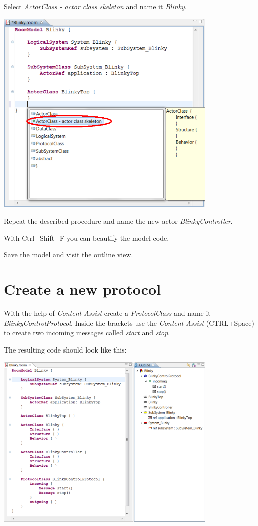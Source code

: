 Select \textit{ActorClass - actor class skeleton} and name it \textit{Blinky}.

\includegraphics[width=0.8\textwidth]{images/020-Blinky01.png}

Repeat the described procedure and name the new actor \textit{BlinkyController}.

With Ctrl+Shift+F you can beautify the model code. 

Save the model and visit the outline view.

\section{Create a new protocol}

With the help of \textit{Content Assist} create a \textit{ProtocolClass} and name it \textit{BlinkyControlProtocol}.
Inside the brackets use the \textit{Content Assist} (CTRL+Space) to create two incoming messages called \textit{start} and \textit{stop}.

The resulting code should look like this:

\includegraphics[width=0.8\textwidth]{images/020-Blinky03.png}


